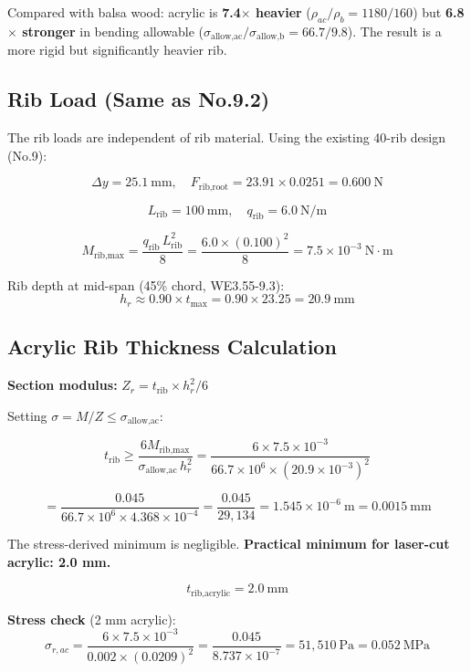 \documentclass[10pt,a4paper]{article}
\begin{document}
Compared with balsa wood: acrylic is \textbf{7.4$\times$ heavier} ($\rho_{ac}/\rho_b = 1180/160$) but \textbf{6.8$\times$ stronger} in bending allowable ($\sigma_{\text{allow,ac}}/\sigma_{\text{allow,b}} = 66.7/9.8$). The result is a more rigid but significantly heavier rib.

\subsection{Rib Load (Same as No.9.2)}

The rib loads are independent of rib material. Using the existing 40-rib design (No.9):

\[
\Delta y = 25.1\ \text{mm}, \quad F_{\text{rib,root}} = 23.91 \times 0.0251 = 0.600\ \text{N}
\]

\[
L_{\text{rib}} = 100\ \text{mm}, \quad q_{\text{rib}} = 6.0\ \text{N/m}
\]

\[
M_{\text{rib,max}} = \frac{q_{\text{rib}}\, L_{\text{rib}}^2}{8} = \frac{6.0 \times (0.100)^2}{8} = 7.5 \times 10^{-3}\ \text{N}\cdot\text{m}
\]

Rib depth at mid-span (45\% chord, WE3.55-9.3):
\[
h_r \approx 0.90 \times t_{\max} = 0.90 \times 23.25 = 20.9\ \text{mm}
\]

\subsection{Acrylic Rib Thickness Calculation}

\textbf{Section modulus:} $Z_r = t_{\text{rib}} \times h_r^2 / 6$

Setting $\sigma = M/Z \leq \sigma_{\text{allow,ac}}$:

\[
t_{\text{rib}} \geq \frac{6 M_{\text{rib,max}}}{\sigma_{\text{allow,ac}}\, h_r^2} = \frac{6 \times 7.5 \times 10^{-3}}{66.7 \times 10^6 \times (20.9 \times 10^{-3})^2}
\]

\[
= \frac{0.045}{66.7 \times 10^6 \times 4.368 \times 10^{-4}} = \frac{0.045}{29{,}134} = 1.545 \times 10^{-6}\ \text{m} = 0.0015\ \text{mm}
\]

The stress-derived minimum is negligible. \textbf{Practical minimum for laser-cut acrylic: 2.0 mm.}

\[
\boxed{t_{\text{rib,acrylic}} = 2.0\ \text{mm}}
\]

\textbf{Stress check} (2 mm acrylic):
\[
\sigma_{r,ac} = \frac{6 \times 7.5 \times 10^{-3}}{0.002 \times (0.0209)^2} = \frac{0.045}{8.737 \times 10^{-7}} = 51{,}510\ \text{Pa} = 0.052\ \text{MPa}
\]
\end{document}
